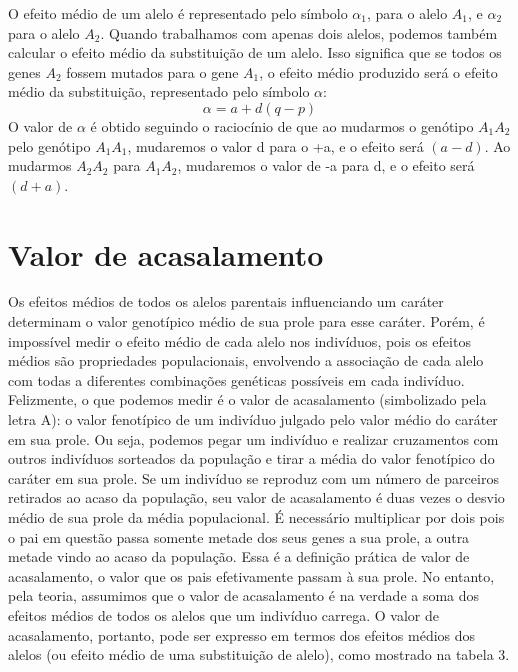 \documentclass[portuges,]{tufte-handout}
\begin{document}
O efeito médio de um alelo é representado pelo símbolo \(\alpha_1\),
para o alelo \(A_1\), e \(\alpha_2\) para o alelo \(A_2\). Quando
trabalhamos com apenas dois alelos, podemos também calcular o efeito
médio da substituição de um alelo. Isso significa que se todos os genes
\(A_2\) fossem mutados para o gene \(A_1\), o efeito médio produzido
será o efeito médio da substituição, representado pelo símbolo
\(\alpha\): \[
\alpha = a + d(q-p)
\] O valor de \(\alpha\) é obtido seguindo o raciocínio de que ao
mudarmos o genótipo \(A_1A_2\) pelo genótipo \(A_1A_1\), mudaremos o
valor d para o +a, e o efeito será \((a - d)\). Ao mudarmos \(A_2A_2\)
para \(A_1A_2\), mudaremos o valor de -a para d, e o efeito será
\((d + a)\).

\section{Valor de acasalamento}\label{valor-de-acasalamento}

Os efeitos médios de todos os alelos parentais influenciando um caráter
determinam o valor genotípico médio de sua prole para esse caráter.
Porém, é impossível medir o efeito médio de cada alelo nos indivíduos,
pois os efeitos médios são propriedades populacionais, envolvendo a
associação de cada alelo com todas a diferentes combinações genéticas
possíveis em cada indivíduo. Felizmente, o que podemos medir é o valor
de acasalamento (simbolizado pela letra A): o valor fenotípico de um
indivíduo julgado pelo valor médio do caráter em sua prole. Ou seja,
podemos pegar um indivíduo e realizar cruzamentos com outros indivíduos
sorteados da população e tirar a média do valor fenotípico do caráter em
sua prole. Se um indivíduo se reproduz com um número de parceiros
retirados ao acaso da população, seu valor de acasalamento é duas vezes
o desvio médio de sua prole da média populacional. É necessário
multiplicar por dois pois o pai em questão passa somente metade dos seus
genes a sua prole, a outra metade vindo ao acaso da população. Essa é a
definição prática de valor de acasalamento, o valor que os pais
efetivamente passam à sua prole. No entanto, pela teoria, assumimos que
o valor de acasalamento é na verdade a soma dos efeitos médios de todos
os alelos que um indivíduo carrega. O valor de acasalamento, portanto,
pode ser expresso em termos dos efeitos médios dos alelos (ou efeito
médio de uma substituição de alelo), como mostrado na tabela 3.
\end{document}
